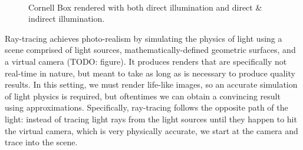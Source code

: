 \begin{figure}[h!]
    \centering
    ~
    \caption[Cornell Box direct \& indirect illumination]{Cornell Box rendered with both direct illumination and direct \& indirect illumination.}
    \label{fig:compare_illumination}
\end{figure}

Ray-tracing achieves photo-realism by simulating the physics of light using a scene comprised of light sources, mathematically-defined geometric surfaces, and a virtual camera (TODO: figure). It produces renders that are specifically not real-time in nature, but meant to take as long as is necessary to produce quality results. In this setting, we must render life-like images, so an accurate simulation of light physics is required, but oftentimes we can obtain a convincing result using approximations. Specifically, ray-tracing follows the opposite path of the light: instead of tracing light rays from the light sources until they happen to hit the virtual camera, which is very physically accurate, we start at the camera and trace into the scene.

